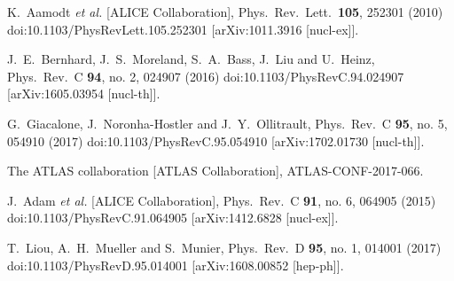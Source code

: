 \documentclass[aps,prc,twocolumn,superscriptaddress,showpacs,floatfix,nofootinbib]{revtex4-1}
\begin{document}
\begin{thebibliography}{99}
  K.~Aamodt {\it et al.} [ALICE Collaboration],
  Phys.\ Rev.\ Lett.\  {\bf 105}, 252301 (2010)
  doi:10.1103/PhysRevLett.105.252301
  [arXiv:1011.3916 [nucl-ex]].


  J.~E.~Bernhard, J.~S.~Moreland, S.~A.~Bass, J.~Liu and U.~Heinz,
  Phys.\ Rev.\ C {\bf 94}, no. 2, 024907 (2016)
  doi:10.1103/PhysRevC.94.024907
  [arXiv:1605.03954 [nucl-th]].


  G.~Giacalone, J.~Noronha-Hostler and J.~Y.~Ollitrault,
  Phys.\ Rev.\ C {\bf 95}, no. 5, 054910 (2017)
  doi:10.1103/PhysRevC.95.054910
  [arXiv:1702.01730 [nucl-th]].

  The ATLAS collaboration [ATLAS Collaboration],
  ATLAS-CONF-2017-066.

  J.~Adam {\it et al.} [ALICE Collaboration],
  Phys.\ Rev.\ C {\bf 91}, no. 6, 064905 (2015)
  doi:10.1103/PhysRevC.91.064905
  [arXiv:1412.6828 [nucl-ex]].


  T.~Liou, A.~H.~Mueller and S.~Munier,
  Phys.\ Rev.\ D {\bf 95}, no. 1, 014001 (2017)
  doi:10.1103/PhysRevD.95.014001
  [arXiv:1608.00852 [hep-ph]].

\end{thebibliography}
\end{document}

